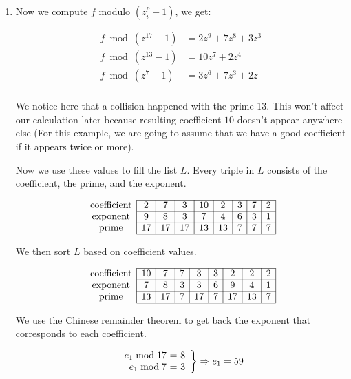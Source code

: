 \documentclass[letterpaper,10pt]{article}
\begin{document}
\begin{enumerate}


 \item Now we compute $f$ modulo $(z^p_i-1)$, we get:

 

  \begin{align*}
    f \bmod (z^{17}-1) &= 2z^{9}+7z^{8}+3z^{3}  \\
    f \bmod (z^{13}-1) &= 10z^{7}+2z^{4}        \\
    f \bmod (z^{7}-1) &= 3z^{6}+7z^{3}+2z       \\    
  \end{align*}

  We notice here that a collision happened with the prime 13. This won't affect our 
  calculation later because resulting coefficient $10$ doesn't appear anywhere else 
  (For this example, we are going to assume that we have a good coefficient if it 
  appears twice or more).
    
  Now we use these values to fill the list $L$. Every triple in $L$
  consists of the coefficient, the prime, and the exponent.
  
  $$
  \begin{array}{c|*{8}{c|}}
    \cline{2-9}
    \text{coefficient} & 2 & 7 & 3 & 10 & 2 & 3 & 7 & 2 \\
    \cline{2-9}
    \text{exponent} & 9 & 8 & 3 & 7 & 4 & 6 & 3 & 1     \\
    \cline{2-9}
    \text{prime} & 17 & 17 & 17 & 13 & 13 & 7 & 7 & 7    \\
    \cline{2-9}
  \end{array}
  $$
    
  We then sort $L$ based on coefficient values.

  $$
  \begin{array}{c|*{8}{c|}}
    \cline{2-9}
    \text{coefficient} & 10 & 7 & 7 & 3 & 3 & 2 & 2 & 2 \\
    \cline{2-9}
    \text{exponent} & 7 & 8 & 3 & 3 & 6 & 9 & 4 & 1      \\
    \cline{2-9}
    \text{prime} & 13 & 17 & 7 & 17 & 7 & 17 & 13 & 7       \\
    \cline{2-9}
  \end{array}
  $$
  
  We use the Chinese remainder theorem to get back the exponent that corresponds 
  to each coefficient.

  $$
    \left.
    \begin{array}{r@{\ }c@{\ }l}      
      e_1 \bmod 17 &=& 8 \\
      e_1 \bmod 7 &=& 3  \\
    \end{array}
    \right\}
    \Rightarrow e_1 = 59
  $$


\end{enumerate}
\end{document}
